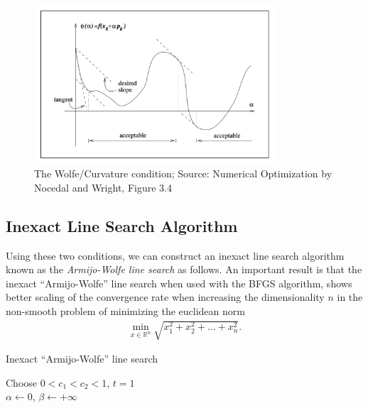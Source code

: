 \documentclass{article}
\begin{document}
\begin{figure}
    \centering
    \includegraphics[width=0.8\textwidth]{plots/wolfe_condition.png}
    \caption{The Wolfe/Curvature condition;
        Source: Numerical Optimization by Nocedal and Wright,
        Figure 3.4}
    \label{fig:wolfe_condition}
\end{figure}

\subsection{Inexact Line Search Algorithm}

Using these two conditions, we can construct an inexact line search algorithm
known as the \emph{Armijo-Wolfe line search} as follows.
An important result is that the inexact ``Armijo-Wolfe'' line search
when used with the BFGS algorithm, shows better scaling of the
convergence rate when increasing the dimensionality $n$ in the
non-smooth problem of minimizing the euclidean norm
\begin{align*}
    \min_{x \in \mathbb{R}^n}
    \sqrt{x_1^2 + x_2^2 + \ldots + x_n^2}.
\end{align*}

\begin{algorithm}[htbp]
    \caption{Inexact ``Armijo-Wolfe'' line search}
    \SetAlgoLined
    Choose $0 < c_1 < c_2 < 1$, $t = 1$ \\
    $\alpha \gets 0$, $\beta \gets +\infty$ \\
    \label{alg:inexact_line_search}
\end{algorithm}
\end{document}
